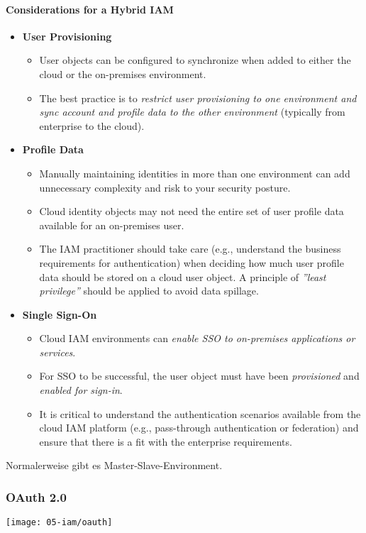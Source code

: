\paragraph{Considerations for a Hybrid IAM}
\begin{itemize}
    \item \textbf{User Provisioning}
    \begin{itemize}
        \item User objects can be configured to synchronize when added to either the cloud or the on-premises environment.
        \item The best practice is to \textit{restrict user provisioning to one environment and sync account and profile data to the other environment} (typically from enterprise to the cloud).\\
    \end{itemize}
    \item \textbf{Profile Data}
    \begin{itemize}
        \item Manually maintaining identities in more than one environment can add unnecessary complexity and risk to your security posture.
        \item Cloud identity objects may not need the entire set of user profile data available for an on-premises user.
        \item The IAM practitioner should take care (e.g., understand the business requirements for authentication) when deciding how much user profile data should be stored on a cloud user object. A principle of \textit{''least privilege''} should be applied to avoid data spillage.\\
    \end{itemize}
    \item \textbf{Single Sign-On}
    \begin{itemize}
        \item Cloud IAM environments can \textit{enable SSO to on-premises applications or services}.
        \item For SSO to be successful, the user object must have been \textit{provisioned} and \textit{enabled for sign-in}.
        \item It is critical to understand the authentication scenarios available from the cloud IAM platform (e.g., pass-through authentication or federation) and ensure that there is a fit with the enterprise requirements.\\
    \end{itemize}
\end{itemize}

Normalerweise gibt es Master-Slave-Environment.

\subsubsection{OAuth 2.0}
\begin{center}
    \texttt{[image: 05-iam/oauth]}
    \vspace{-8pt}
\end{center}

